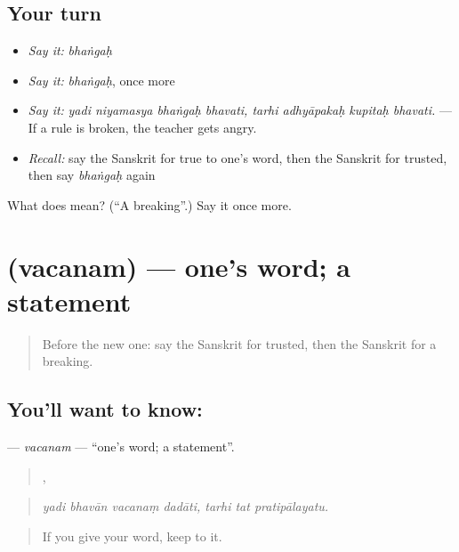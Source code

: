\subsection*{Your turn}
\begin{itemize}
\raggedright
  \item \emph{Say it:} \emph{bhaṅgaḥ}
  \item \emph{Say it:} \emph{bhaṅgaḥ}, once more
  \item \emph{Say it:} \emph{yadi niyamasya bhaṅgaḥ bhavati, tarhi adhyāpakaḥ kupitaḥ bhavati.} — If a rule is broken, the teacher gets angry.
  \item \emph{Recall:} say the Sanskrit for true to one's word, then the Sanskrit for trusted, then say \emph{bhaṅgaḥ} again
\end{itemize}

\begin{tcolorbox}[breakable,colback=teal!4,colframe=teal!35!black,title={Before you move on}]
What does  mean? (\textquotedblleft{}A breaking\textquotedblright{}.) Say it once more.
\end{tcolorbox}
\section[\texorpdfstring{\sk{वचनम्} (vacanam)}{वचनम् (vacanam)}]{ (vacanam) — one's word; a statement}

\label{lesson:SA-C535-vacanam}



\begin{quote}
Before the new one: say the Sanskrit for trusted, then the Sanskrit for a breaking.
\end{quote}

\subsection*{You'll want to know: }
\textbf{} — \emph{vacanam} — \textquotedblleft{}one's word; a statement\textquotedblright{}.

\begin{quote}
   ,   
\end{quote}

\begin{quote}
\emph{yadi bhavān vacanaṃ dadāti, tarhi tat pratipālayatu.}
\end{quote}

\begin{quote}
If you give your word, keep to it.
\end{quote}


